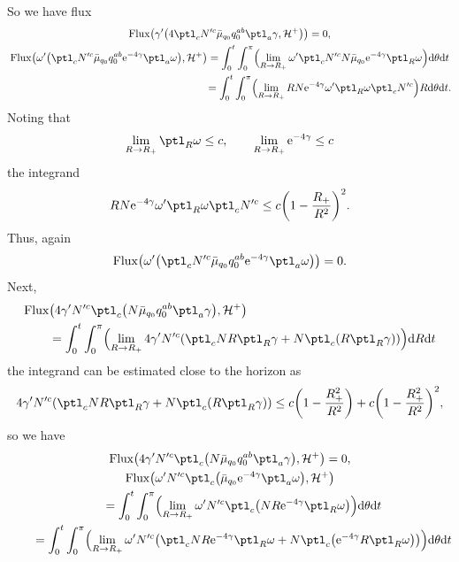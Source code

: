 So we have flux
\begin{gather*}
{\rm Flux} \bigl(\gamma' \bigl(4 \ptl_c N'^c \bar{\mu}_{q_0} q^{ab} _0 \ptl_a \gamma, \mathcal{H}^+\bigr)\bigr) =0,
\\
{\rm Flux} \bigl(\omega' \bigl(\ptl_c N'^c \bar{\mu}_{q_0} q^{ab} _0 {\rm e}^{-4 \gamma} \ptl_a \omega\bigr), \mathcal{H}^+\bigr)
= \int^t_0 \int^\pi_0 \Bigl(\lim_{R \to R_+} \omega' \ptl_c N'^c N \bar{\mu}_{q_0} {\rm e}^{-4\gamma} \ptl_R \omega\Bigr) {\rm d} \theta {\rm d}t \notag\\
\hphantom{{\rm Flux} \bigl(\omega' \bigl(\ptl_c N'^c \bar{\mu}_{q_0} q^{ab} _0 {\rm e}^{-4 \gamma} \ptl_a \omega\bigr), \mathcal{H}^+\bigr)}{}
= \int^t_0 \int^\pi_0 \Bigl(\lim_{R \to R_+} R N {\rm e}^{-4\gamma} \omega' \ptl_R \omega \ptl_c N'^c\Bigr)R {\rm d}\theta {\rm d}t.
\end{gather*}
Noting that
\begin{align*}
\lim_{R \to R_+} \ptl_R \omega \leq c, \qquad \lim_{R \to R_+} {\rm e}^{-4\gamma} \leq c
\end{align*}
the integrand
\begin{align*}
R N {\rm e}^{-4\gamma} \omega' \ptl_R \omega \ptl_c N'^c \leq c \biggl(1- \frac{R_+}{R^2}\biggr)^2.
\end{align*}
Thus, again
\begin{align*}
{\rm Flux} \bigl(\omega' \bigl(\ptl_c N'^c \bar{\mu}_{q_0} q^{ab} _0 {\rm e}^{-4 \gamma} \ptl_a \omega\bigr)\bigr) =0.
\end{align*}
Next,
\begin{align*}
& {\rm Flux} \bigl(4\gamma' N'^c\ptl_c \bigl(N \bar{\mu}_{q_0} q^{ab}_0 \ptl_a \gamma\bigr), \mathcal{H}^+\bigr) \notag \\
&\qquad{}= \int^t_0 \int^\pi_0 \Bigl(\lim_{R \to R_+} 4 \gamma' N'^c (\ptl_c N R \ptl_R \gamma + N \ptl_c (R \ptl_R \gamma) ) \Bigr) {\rm d}R {\rm d}t
\end{align*}
the integrand can be estimated close to the horizon as
\begin{align*}
4 \gamma' N'^c (\ptl_c N R \ptl_R \gamma + N \ptl_c (R \ptl_R \gamma) ) \leq c \biggl(1- \frac{R^2_+}{R^2}\biggr) + c \biggl(1- \frac{R^2_+}{R^2}\biggr)^2,
\end{align*}
so we have
\begin{gather*}
{\rm Flux} \bigl(4\gamma' N'^c\ptl_c \bigl(N \bar{\mu}_{q_0} q^{ab}_0 \ptl_a \gamma\bigr), \mathcal{H}^+\bigr) =0,
\\
{\rm Flux} \bigl(\omega' N'^c \ptl_c \bigl(\bar{\mu}_{q_0} {\rm e}^{-4\gamma} \ptl_a \omega\bigr), \mathcal{H}^+\bigr) \notag\\
\qquad{}=
\int^t_0 \int^\pi_0 \Bigl(\lim_{R \to R_+} \omega' N'^c \ptl_c\bigl(N R {\rm e}^{-4\gamma} \ptl_R \omega\bigr) \Bigr) {\rm d}\theta {\rm d}t \notag\\
\qquad{}= \int^t_0 \int^\pi_0 \Bigl(\lim_{R \to R_+} \omega' N'^c \bigl(\ptl_c N R {\rm e}^{-4\gamma} \ptl_R \omega + N \ptl_c \bigl({\rm e}^{-4\gamma} R \ptl_R \omega\bigr)\bigr) \Bigr) {\rm d} \theta {\rm d}t
\end{gather*}
